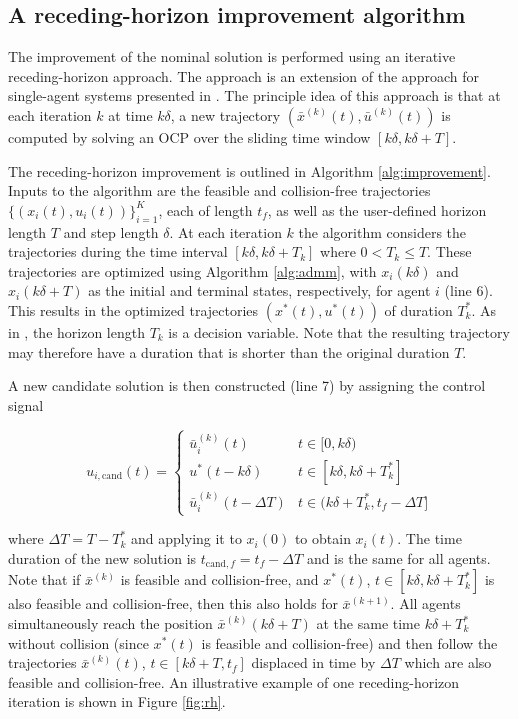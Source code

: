 \documentclass[letterpaper, 10 pt, conference]{ieeeconf}  %
\begin{document}
\subsection{A receding-horizon improvement algorithm}

The improvement of the nominal solution is performed using an iterative receding-horizon approach. The approach is an extension of the approach for single-agent systems presented in \cite{bergman2020optimization}. The principle idea of this approach is that at each iteration $k$ at time $k\delta$, a new trajectory $(\bar{x}^{(k)}(t), \bar{u}^{(k)}(t))$ is computed by solving an OCP over the sliding time window $[k\delta, k\delta + T]$.

The receding-horizon improvement is outlined in Algorithm \ref{alg:improvement}. Inputs to the algorithm are the feasible and collision-free trajectories $\{(x_i(t), u_i(t))\}_{i=1}^{K}$, each of length $t_f$, as well as the user-defined horizon length $T$ and step length $\delta$. At each iteration $k$ the algorithm considers the trajectories during the time interval $[k\delta, k\delta + T_k]$ where $0 < T_k \leq T$. These trajectories are optimized using Algorithm \ref{alg:admm}, with $x_i(k\delta)$ and $x_i(k\delta + T)$ as the initial and terminal states, respectively, for agent $i$ (line 6). This results in the optimized trajectories $(x^*(t), u^*(t))$ of duration $T_k^*$. As in \cite{bergman2020optimization}, the horizon length $T_k$ is a decision variable. Note that the resulting trajectory may therefore have a duration that is shorter than the original duration $T$.

A new candidate solution is then constructed (line 7) by assigning the control signal

\begin{equation}
u_{i, \text{cand}}(t) = 
	\begin{cases}
		\bar{u}_i^{(k)}(t) & t \in [0, k\delta)\\
		u^*(t-k\delta) & t \in [k\delta, k\delta+T_k^*]\\
		\bar{u}_i^{(k)}(t-\Delta T) & t \in (k\delta+T_k^*, t_f-\Delta T]
	\end{cases}
\end{equation}

\noindent where $\Delta T = T - T_k^*$ and applying it to $x_i(0)$ to obtain $x_i(t)$. The time duration of the new solution is $t_{\text{cand}, f} = t_f - \Delta T$ and is the same for all agents. Note that if $\bar{x}^{(k)}$ is feasible and collision-free, and $x^*(t)$, $t \in [k\delta, k\delta+T_k^*]$ is also feasible and collision-free, then this also holds for $\bar{x}^{(k+1)}$. All agents simultaneously reach the position $\bar{x}^{(k)}(k\delta + T)$ at the same time $k\delta + T_k^*$ without collision (since $x^*(t)$ is feasible and collision-free) and then follow the trajectories $\bar{x}^{(k)}(t)$, $t \in [k\delta + T, t_f]$ displaced in time by $\Delta T$ which are also feasible and collision-free. An illustrative example of one receding-horizon iteration is shown in Figure \ref{fig:rh}.
\end{document}
